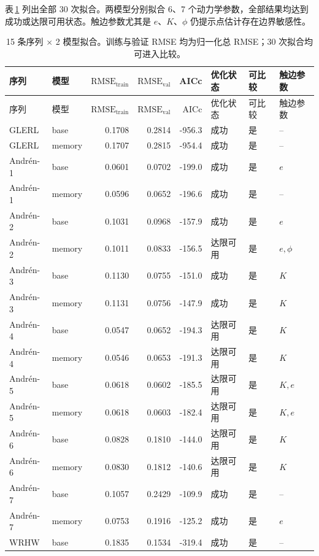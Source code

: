 \documentclass[12pt,a4paper]{ctexart}
\newcommand{\trainrmse}{\mathrm{RMSE}_{\mathrm{train}}}
\newcommand{\valrmse}{\mathrm{RMSE}_{\mathrm{val}}}
\begin{document}
表\,\ref{tab:fit-full} 列出全部 30 次拟合。两模型分别拟合 6、7 个动力学参数，全部结果均达到成功或达限可用状态。触边参数尤其是 $e$、$K$、$\phi$ 仍提示点估计存在边界敏感性。

\begin{landscape}
\scriptsize
\begin{longtable}{llrrrlll}
 \caption{15 条序列 $\times$ 2 模型拟合。训练与验证 RMSE 均为归一化总 RMSE；30 次拟合均可进入比较。}\label{tab:fit-full}\\
 \toprule
 序列 & 模型 & $\trainrmse$ & $\valrmse$ & AICc & 优化状态 & 可比较 & 触边参数\\
 \midrule
 \endfirsthead
 \toprule
 序列 & 模型 & $\trainrmse$ & $\valrmse$ & AICc & 优化状态 & 可比较 & 触边参数\\
 \midrule
 \endhead
 GLERL & base & 0.1708 & 0.2814 & -956.3 & 成功 & 是 & -- \\
 GLERL & memory & 0.1707 & 0.2815 & -954.4 & 成功 & 是 & -- \\
 Andrén-1 & base & 0.0601 & 0.0702 & -199.0 & 成功 & 是 & $e$ \\
 Andrén-1 & memory & 0.0596 & 0.0652 & -196.6 & 成功 & 是 & -- \\
 Andrén-2 & base & 0.1031 & 0.0968 & -157.9 & 成功 & 是 & $e$ \\
 Andrén-2 & memory & 0.1011 & 0.0833 & -156.5 & 达限可用 & 是 & $e,\phi$ \\
 Andrén-3 & base & 0.1130 & 0.0755 & -151.0 & 成功 & 是 & $K$ \\
 Andrén-3 & memory & 0.1131 & 0.0756 & -147.9 & 成功 & 是 & $K$ \\
 Andrén-4 & base & 0.0547 & 0.0652 & -194.3 & 达限可用 & 是 & $K$ \\
 Andrén-4 & memory & 0.0546 & 0.0653 & -191.3 & 达限可用 & 是 & $K$ \\
 Andrén-5 & base & 0.0618 & 0.0602 & -185.5 & 达限可用 & 是 & $K,e$ \\
 Andrén-5 & memory & 0.0618 & 0.0603 & -182.4 & 达限可用 & 是 & $K,e$ \\
 Andrén-6 & base & 0.0828 & 0.1810 & -144.0 & 达限可用 & 是 & $K$ \\
 Andrén-6 & memory & 0.0830 & 0.1812 & -140.6 & 达限可用 & 是 & $K$ \\
 Andrén-7 & base & 0.1057 & 0.2429 & -109.9 & 成功 & 是 & -- \\
 Andrén-7 & memory & 0.0753 & 0.1916 & -125.2 & 成功 & 是 & $e$ \\
 WRHW & base & 0.1835 & 0.1534 & -319.4 & 成功 & 是 & -- \\

\end{longtable}
\end{landscape}
\end{document}
